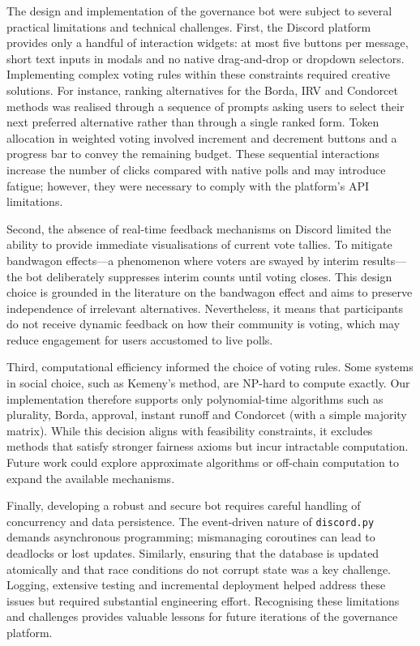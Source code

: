 The design and implementation of the governance bot were subject to
several practical limitations and technical challenges.  First, the
Discord platform provides only a handful of interaction widgets: at most
five buttons per message, short text inputs in modals and no native
drag‑and‑drop or dropdown selectors.  Implementing complex voting rules
within these constraints required creative solutions.  For instance,
ranking alternatives for the Borda, IRV and Condorcet methods was
realised through a sequence of prompts asking users to select their next
preferred alternative rather than through a single ranked form.  Token
allocation in weighted voting involved increment and decrement buttons and
a progress bar to convey the remaining budget.  These sequential
interactions increase the number of clicks compared with native polls and
may introduce fatigue; however, they were necessary to comply with the
platform’s API limitations.

Second, the absence of real-time feedback mechanisms on Discord limited
the ability to provide immediate visualisations of current vote tallies.
To mitigate bandwagon effects—a phenomenon where voters are swayed by
interim results—the bot deliberately suppresses interim counts until
voting closes.  This design choice is grounded in the literature on the
bandwagon effect and aims to preserve independence of irrelevant
alternatives.  Nevertheless, it means that participants do not receive
dynamic feedback on how their community is voting, which may reduce
engagement for users accustomed to live polls.

Third, computational efficiency informed the choice of voting rules.  Some
systems in social choice, such as Kemeny’s method, are NP-hard to compute
exactly.  Our implementation therefore supports only polynomial-time
algorithms such as plurality, Borda, approval, instant runoff and
Condorcet (with a simple majority matrix).  While this decision aligns
with feasibility constraints, it excludes methods that satisfy stronger
fairness axioms but incur intractable computation.  Future work could
explore approximate algorithms or off-chain computation to expand the
available mechanisms.

Finally, developing a robust and secure bot requires careful handling of
concurrency and data persistence.  The event-driven nature of
\texttt{discord.py} demands asynchronous programming; mismanaging
coroutines can lead to deadlocks or lost updates.  Similarly, ensuring
that the database is updated atomically and that race conditions do not
corrupt state was a key challenge.  Logging, extensive testing and
incremental deployment helped address these issues but required
substantial engineering effort.  Recognising these limitations and
challenges provides valuable lessons for future iterations of the
governance platform.